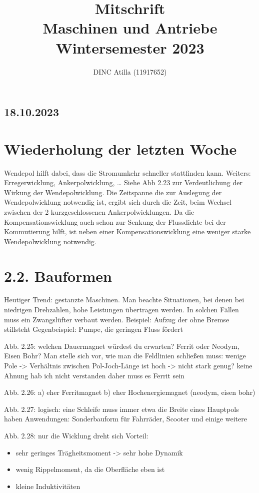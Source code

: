 \documentclass[a4paper]{article}
\title{Mitschrift\\Maschinen und Antriebe Wintersemester 2023}
\author{DINC Atilla (11917652)}
\begin{document}
\normalsize
\maketitle

\subsection*{18.10.2023}

\section*{Wiederholung der letzten Woche}
Wendepol hilft dabei, dass die Stromumkehr schneller stattfinden kann.
Weiters: Erregerwicklung, Ankerpolwicklung, \ldots\newline
Siehe Abb 2.23 zur Verdeutlichung der Wirkung  der Wendepolwicklung.
Die Zeitspanne die zur Auslegung der Wendepolwicklung notwendig ist, ergibt sich durch die Zeit, beim Wechsel zwischen der 2 kurzgeschlossenen Ankerpolwicklungen.
Da die Kompensationswicklung auch schon zur Senkung der Flussdichte bei der Kommutierung hilft, ist neben einer Kompensationswicklung eine weniger starke Wendepolwicklung notwendig.
\section*{2.2. Bauformen}
Heutiger Trend: gestanzte Maschinen. 
Man beachte Situationen, bei denen bei niedrigen Drehzahlen, hohe Leistungen übertragen werden.
In solchen Fällen muss ein Zwangslüfter verbaut werden.
Beispiel: Aufzug der ohne Bremse stillsteht
Gegenbeispiel: Pumpe, die geringen Fluss fördert

Abb. 2.25: welchen Dauermagnet würdest du erwarten? Ferrit oder Neodym, Eisen Bohr?
Man stelle sich vor, wie man die Feldlinien schließen muss:
    wenige Pole -> Verhältnis zwischen Pol-Joch-Länge ist hoch -> nicht stark genug? keine Ahnung hab ich nicht verstanden
daher muss es Ferrit sein

Abb. 2.26: a) eher Ferritmagnet b) eher Hochenergiemagnet (neodym, eisen bohr)

Abb. 2.27: logisch: eine Schleife muss immer etwa die Breite eines Hauptpols haben
Anwendungen: Sonderbauform für Fahrräder, Scooter und einige weitere

Abb. 2.28: nur die Wicklung dreht sich
Vorteil:
\begin{itemize}
\item sehr geringes Trägheitsmoment -> sehr hohe Dynamik
\item wenig Rippelmoment, da die Oberfläche eben ist
\item kleine Induktivitäten
\end{itemize}
\end{document}
